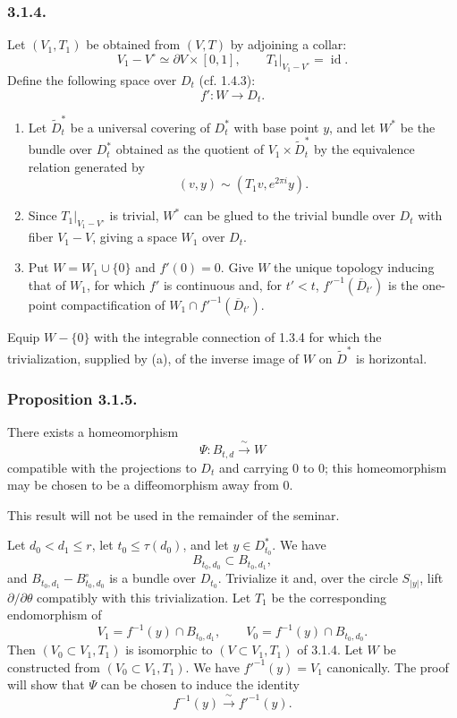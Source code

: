 \subsubsection*{3.1.4.}
Let $(V_1,T_1)$ be obtained from $(V,T)$ by adjoining a collar:
\[
V_1-V^\circ\simeq\partial V\times[0,1],
\qquad
T_1|_{V_1-V^\circ}=\operatorname{id}.
\]
Define the following space over $D_t$ (cf. 1.4.3):
\[
f':W\longrightarrow D_t.
\]

\begin{enumerate}[label=(\alph*)]
\item Let $\widetilde D_t^*$ be a universal covering of $D_t^*$ with
  base point $y$, and let $W^*$ be the bundle over $D_t^*$ obtained as
  the quotient of $V_1\times\widetilde D_t^*$ by the equivalence
  relation generated by
  \[
  (v,y)\sim(T_1v,e^{2\pi i}y).
  \]
\item Since $T_1|_{V_1-V^\circ}$ is trivial, $W^*$ can be glued to
  the trivial bundle over $D_t$ with fiber $V_1-V$, giving a space
  $W_1$ over $D_t$.
\item Put $W=W_1\cup\{0\}$ and $f'(0)=0$.  Give $W$ the unique
  topology inducing that of $W_1$, for which $f'$ is continuous and,
  for $t'<t$, ${f'}^{-1}(\overline D_{t'})$ is the one-point
  compactification of
  $W_1\cap {f'}^{-1}(\overline D_{t'})$.
\end{enumerate}

Equip $W-\{0\}$ with the integrable connection of 1.3.4 for which
the trivialization, supplied by (a), of the inverse image of $W$ on
$\widetilde D^*$ is horizontal.

\subsubsection*{Proposition 3.1.5.}
There exists a homeomorphism
\[
\Psi:B_{t,d}\xrightarrow{\ \sim\ }W
\]
compatible with the projections to $D_t$ and carrying $0$ to $0$;
this homeomorphism may be chosen to be a diffeomorphism away from
$0$.

This result will not be used in the remainder of the seminar.

Let $d_0<d_1\leq r$, let $t_0\leq\tau(d_0)$, and let
$y\in D_{t_0}^*$.  We have
\[
B_{t_0,d_0}\subset B_{t_0,d_1},
\]
and $B_{t_0,d_1}-B_{t_0,d_0}^{\circ}$ is a bundle over $D_{t_0}$.
Trivialize it and, over the circle $S_{|y|}$, lift
$\partial/\partial\theta$ compatibly with this trivialization.  Let
$T_1$ be the corresponding endomorphism of
\[
V_1=f^{-1}(y)\cap B_{t_0,d_1},
\qquad
V_0=f^{-1}(y)\cap B_{t_0,d_0}.
\]
Then $(V_0\subset V_1,T_1)$ is isomorphic to
$(V\subset V_1,T_1)$ of 3.1.4.  Let $W$ be constructed from
$(V_0\subset V_1,T_1)$.  We have ${f'}^{-1}(y)=V_1$ canonically.
The proof will show that $\Psi$ can be chosen to induce the identity
\[
f^{-1}(y)\xrightarrow{\ \sim\ }{f'}^{-1}(y).
\]

